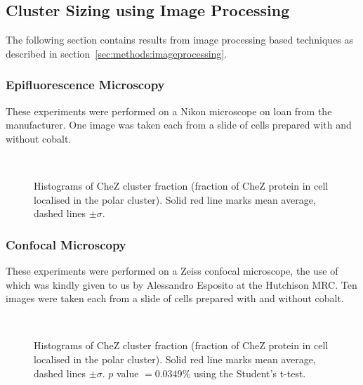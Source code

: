 \documentclass[../main.tex]{subfiles}
\begin{document}
\subsection{Cluster Sizing using Image Processing}

The following section contains results from image processing based techniques as described in section~\ref{sec:methods:imageprocessing}.

\subsubsection{Epifluorescence Microscopy}
\label{sec:results:cs:epi}

These experiments were performed on a Nikon microscope on loan from the manufacturer. One image was taken each from a slide of cells prepared with and without cobalt.

\begin{figure}[h!]
\begin{center}
\\
\caption[Image processing results on Nikon microscope]{Histograms of CheZ cluster fraction (fraction of CheZ protein in cell localised in the polar cluster). Solid red line marks mean average, dashed lines \(\pm\sigma\).}
\label{fig:results:nikon}
\end{center}
\end{figure}

\subsubsection{Confocal Microscopy}
\label{sec:results:cs:confocal}
These experiments were performed on a Zeiss confocal microscope, the use of which was kindly given to us by Alessandro Esposito at the Hutchison MRC. Ten images were taken each from a slide of cells prepared with and without cobalt.

\begin{figure}[h!]
\begin{center}
\\
\caption[Image processing results on Zeiss confocal microscope]{Histograms of CheZ cluster fraction (fraction of CheZ protein in cell localised in the polar cluster). Solid red line marks mean average, dashed lines \(\pm\sigma\). \(p\) value \(=0.0349\%\) using the Student's t-test.}
\label{fig:results:zeiss}
\end{center}
\end{figure}
\end{document}
